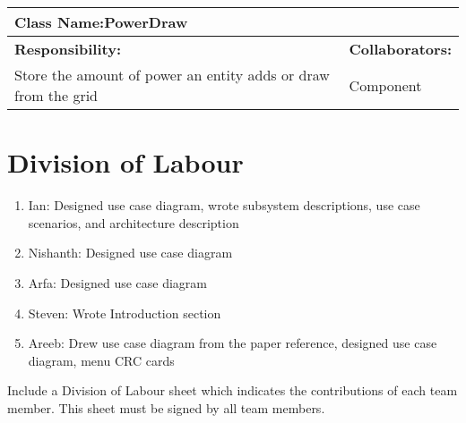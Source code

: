\documentclass[]{article}
\begin{document}
\begin{enumerate}[a)]
\begin{table}[ht]
\begin{tabular}{|p{5cm}|p{5cm}|}
		\hline
		\end{tabular}
	\end{table}
	\begin{table}[ht]
		\centering
		\begin{tabular}{|p{5cm}|p{5cm}|}
		\hline 
		 \multicolumn{2}{|l|}{\textbf{Class Name:}PowerDraw} \\
		\hline
		\textbf{Responsibility:} & \textbf{Collaborators:} \\
		\hline 
		Store the amount of power an entity adds or draw from the grid & Component\\
		\hline
		\end{tabular}
	\end{table}
\end{enumerate}


\appendix
\section{Division of Labour}
\label{sec:division_of_labour}
\begin{enumerate}
	\item Ian: Designed use case diagram, wrote subsystem descriptions, use case scenarios, and architecture description
	\item Nishanth: Designed use case diagram
	\item Arfa: Designed use case diagram
	\item Steven: Wrote Introduction section
	\item Areeb: Drew use case diagram from the paper reference, designed use case diagram, menu CRC cards
\end{enumerate}
Include a Division of Labour sheet which indicates the contributions of each team member. This sheet must be signed by all team members.

\newpage
\end{document}
